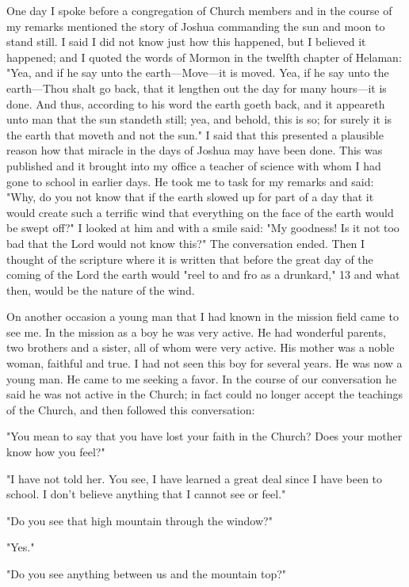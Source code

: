 One day I spoke before a congregation of Church members and in the course of my remarks
mentioned the story of Joshua commanding the sun and moon to stand still. I said I did not
know just how this happened, but I believed it happened; and I quoted the words of Mormon
in the twelfth chapter of Helaman: "Yea, and if he say unto the earth—Move—it is moved.
Yea, if he say unto the earth—Thou shalt go back, that it lengthen out the day for many
hours—it is done. And thus, according to his word the earth goeth back, and it appeareth unto
man that the sun standeth still; yea, and behold, this is so; for surely it is the earth that
moveth and not the sun." I said that this presented a plausible reason how that miracle in the
days of Joshua may have been done. This was published and it brought into my office a
teacher of science with whom I had gone to school in earlier days. He took me to task for my
remarks and said: "Why, do you not know that if the earth slowed up for part of a day that it
would create such a terrific wind that everything on the face of the earth would be swept
off?" I looked at him and with a smile said: "My goodness! Is it not too bad that the Lord
would not know this?" The conversation ended. Then I thought of the scripture where it is
written that before the great day of the coming of the Lord the earth would "reel to and fro as
a drunkard," 13 and what then, would be the nature of the wind.

On another occasion a young man that I had known in the mission field came to see me. In
the mission as a boy he was very active. He had wonderful parents, two brothers and a sister,
all of whom were very active. His mother was a noble woman, faithful and true. I had not
seen this boy for several years. He was now a young man. He came to me seeking a favor. In
the course of our conversation he said he was not active in the Church; in fact could no
longer accept the teachings of the Church, and then followed this conversation:

"You mean to say that you have lost your faith in the Church? Does your mother know how
you feel?"

"I have not told her. You see, I have learned a great deal since I have been to school. I don't
believe anything that I cannot see or feel."

"Do you see that high mountain through the window?"

"Yes."

"Do you see anything between us and the mountain top?"

